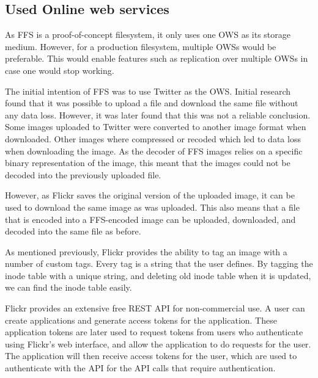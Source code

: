 
\subsection{Used Online web services}
As FFS is a proof-of-concept filesystem, it only uses one OWS as its storage medium. However, for a production filesystem, multiple OWSs would be preferable. This would enable features such as replication over multiple OWSs in case one would stop working.

The initial intention of FFS was to use Twitter as the OWS. Initial research found that it was possible to upload a file and download the same file without any data loss. However, it was later found that this was not a reliable conclusion. Some images uploaded to Twitter were converted to another image format when downloaded. Other images where compressed or recoded which led to data loss when downloading the image. As the decoder of FFS images relies on a specific binary representation of the image, this meant that the images could not be decoded into the previously uploaded file. 

However, as Flickr saves the original version of the uploaded image, it can be used to download the same image as was uploaded. This also means that a file that is encoded into a FFS-encoded image can be uploaded, downloaded, and decoded into the same file as before. 

As mentioned previously, Flickr provides the ability to tag an image with a number of custom tags. Every tag is a string that the user defines. By tagging the inode table with a unique string, and deleting old inode table when it is updated, we can find the inode table easily. 

Flickr provides an extensive free REST API for non-commercial use. A user can create applications and generate access tokens for the application. These application tokens are later used to request tokens from users who authenticate using Flickr's web interface, and allow the application to do requests for the user. The application will then receive access tokens for the user, which are used to authenticate with the API for the API calls that require authentication.

